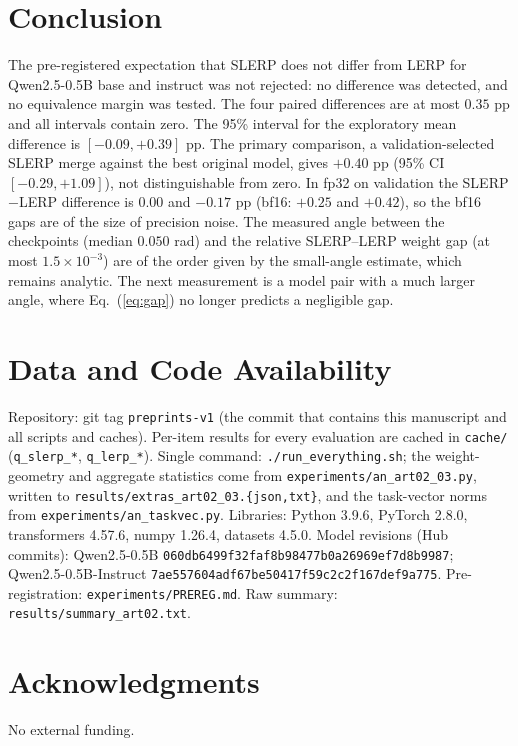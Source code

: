 \documentclass[conference]{IEEEtran}
\begin{document}
\section{Conclusion}
The pre-registered expectation that SLERP does not differ from LERP for Qwen2.5-0.5B base and instruct was not rejected: no difference was detected, and no equivalence margin was tested. The four paired differences are at most $0.35$ pp and all intervals contain zero. The 95\% interval for the exploratory mean difference is $[-0.09,+0.39]$ pp. The primary comparison, a validation-selected SLERP merge against the best original model, gives $+0.40$ pp (95\% CI $[-0.29,+1.09]$), not distinguishable from zero. In fp32 on validation the SLERP$-$LERP difference is $0.00$ and $-0.17$ pp (bf16: $+0.25$ and $+0.42$), so the bf16 gaps are of the size of precision noise. The measured angle between the checkpoints (median $0.050$ rad) and the relative SLERP--LERP weight gap (at most $1.5\times10^{-3}$) are of the order given by the small-angle estimate, which remains analytic. The next measurement is a model pair with a much larger angle, where Eq.~(\ref{eq:gap}) no longer predicts a negligible gap.

\section*{Data and Code Availability}
\sloppy
Repository: git tag \texttt{preprints-v1} (the commit that contains this manuscript and all scripts and caches). Per-item results for every evaluation are cached in \texttt{cache/} (\texttt{q\_slerp\_*}, \texttt{q\_lerp\_*}). Single command: \texttt{./run\_everything.sh}; the weight-geometry and aggregate statistics come from \texttt{experiments/an\_art02\_03.py}, written to \texttt{results/extras\_art02\_03.\{json,txt\}}, and the task-vector norms from \texttt{experiments/an\_taskvec.py}. Libraries: Python 3.9.6, PyTorch 2.8.0, transformers 4.57.6, numpy 1.26.4, datasets 4.5.0. Model revisions (Hub commits): Qwen2.5-0.5B \texttt{060db6499f32faf8\allowbreak b98477b0a26969ef7d8b9987}; Qwen2.5-0.5B-Instruct \texttt{7ae557604adf67be\allowbreak 50417f59c2c2f167def9a775}. Pre-registration: \texttt{experiments/PREREG.md}. Raw summary: \texttt{results/summary\_art02.txt}.

\section*{Acknowledgments}
No external funding.
\end{document}

